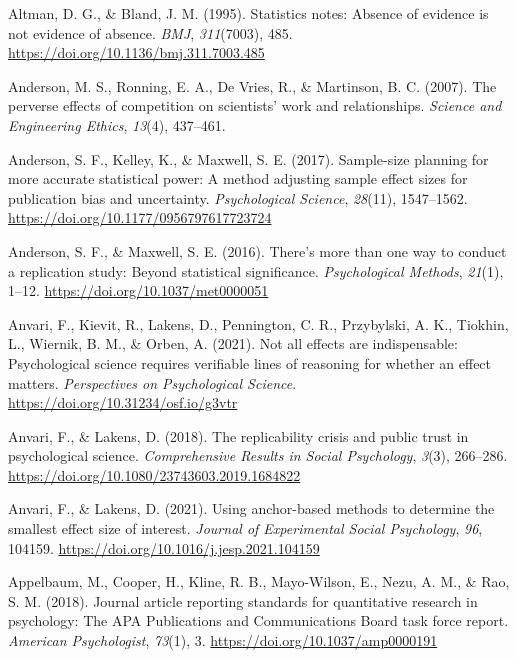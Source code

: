 \documentclass[
  letterpaper,
  DIV=11,
  numbers=noendperiod]{scrreprt}
\newlength{\cslhangindent}
\newlength{\cslentryspacingunit} %
\newenvironment{CSLReferences}[2] %
 {%
  \setlength{\parindent}{0pt}
  \ifodd #1
  \let\oldpar\par
  \def\par{\hangindent=\cslhangindent\oldpar}
  \fi
  \setlength{\parskip}{#2\cslentryspacingunit}
 }%
 {}
\begin{document}
\begin{CSLReferences}{1}{0}
\leavevmode{}%
Altman, D. G., \& Bland, J. M. (1995). Statistics notes: {Absence} of
evidence is not evidence of absence. \emph{BMJ}, \emph{311}(7003), 485.
\url{https://doi.org/10.1136/bmj.311.7003.485}

\leavevmode{}%
Anderson, M. S., Ronning, E. A., De Vries, R., \& Martinson, B. C.
(2007). The perverse effects of competition on scientists' work and
relationships. \emph{Science and Engineering Ethics}, \emph{13}(4),
437--461.

\leavevmode{}%
Anderson, S. F., Kelley, K., \& Maxwell, S. E. (2017). Sample-size
planning for more accurate statistical power: {A} method adjusting
sample effect sizes for publication bias and uncertainty.
\emph{Psychological Science}, \emph{28}(11), 1547--1562.
\url{https://doi.org/10.1177/0956797617723724}

\leavevmode{}%
Anderson, S. F., \& Maxwell, S. E. (2016). There's more than one way to
conduct a replication study: {Beyond} statistical significance.
\emph{Psychological Methods}, \emph{21}(1), 1--12.
\url{https://doi.org/10.1037/met0000051}

\leavevmode{}%
Anvari, F., Kievit, R., Lakens, D., Pennington, C. R., Przybylski, A.
K., Tiokhin, L., Wiernik, B. M., \& Orben, A. (2021). Not all effects
are indispensable: {Psychological} science requires verifiable lines of
reasoning for whether an effect matters. \emph{Perspectives on
Psychological Science}. \url{https://doi.org/10.31234/osf.io/g3vtr}

\leavevmode{}%
Anvari, F., \& Lakens, D. (2018). The replicability crisis and public
trust in psychological science. \emph{Comprehensive Results in Social
Psychology}, \emph{3}(3), 266--286.
\url{https://doi.org/10.1080/23743603.2019.1684822}

\leavevmode{}%
Anvari, F., \& Lakens, D. (2021). Using anchor-based methods to
determine the smallest effect size of interest. \emph{Journal of
Experimental Social Psychology}, \emph{96}, 104159.
\url{https://doi.org/10.1016/j.jesp.2021.104159}

\leavevmode{}%
Appelbaum, M., Cooper, H., Kline, R. B., Mayo-Wilson, E., Nezu, A. M.,
\& Rao, S. M. (2018). Journal article reporting standards for
quantitative research in psychology: {The APA Publications} and
{Communications Board} task force report. \emph{American Psychologist},
\emph{73}(1), 3. \url{https://doi.org/10.1037/amp0000191}


\end{CSLReferences}
\end{document}
